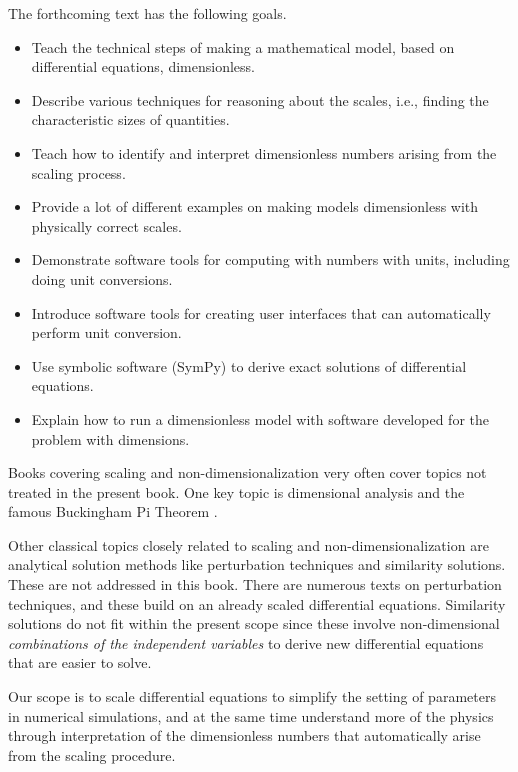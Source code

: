 \documentclass[graybox,envcountchap,sectrefs,final]{svmonodo}
\newenvironment{warning_mdfboxadmon}[1][]{
\begin{warning_mdfboxmdframed}[frametitle=#1]
}
{
\end{warning_mdfboxmdframed}
}
\begin{document}
The forthcoming text has the following goals.

\begin{itemize}
 \item Teach the technical steps of making a mathematical model, based
   on differential equations, dimensionless.

 \item Describe various techniques for reasoning about the scales, i.e.,
   finding the characteristic sizes of quantities.

 \item Teach how to identify and interpret dimensionless numbers arising
   from the scaling process.

 \item Provide a lot of different examples on making models dimensionless
   with physically correct scales.

 \item Demonstrate software tools for computing with numbers with units,
   including doing unit conversions.

 \item Introduce software tools for creating user interfaces that
   can automatically perform unit conversion.

 \item Use symbolic software (SymPy) to derive exact solutions of differential
   equations.

 \item Explain how to run a dimensionless model with software developed
   for the problem with dimensions.
\end{itemize}

\noindent

\begin{warning_mdfboxadmon}
Books covering scaling and non-dimensionalization very often cover
topics not treated in the present book. One key topic is
dimensional analysis and the famous Buckingham Pi Theorem
\cite{Douglas_et_al_1979,Logan_1987}.

Other classical topics closely related to scaling and non-dimensionalization
are analytical solution methods like perturbation techniques and
similarity solutions. These are not addressed in this book.
There are numerous texts on perturbation techniques, and these build
on an already scaled differential equations. Similarity solutions do not
fit within the present scope since these involve non-dimensional
\emph{combinations of the independent variables} to derive new differential
equations that are easier to solve.

Our scope is to scale differential
equations to simplify the setting of parameters in numerical simulations,
and at the same time understand more of the physics
through interpretation of the dimensionless numbers that automatically
arise from the scaling procedure.
\end{warning_mdfboxadmon}
\end{document}
